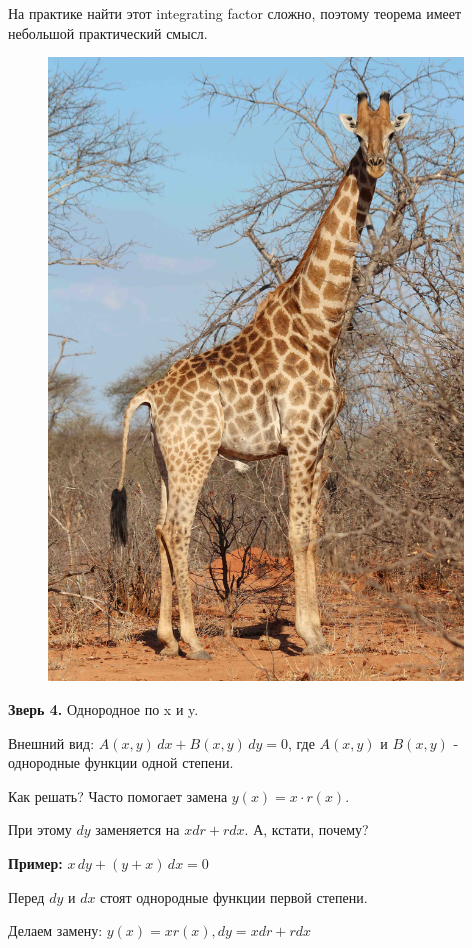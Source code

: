 \documentclass[10pt, a4paper]{article}
\begin{document}
\par На практике найти этот integrating factor сложно, поэтому теорема имеет небольшой практический смысл. \\
\newpage
\pagecolor{JungleGreen}
\begin{figure}[h]
\centering
\includegraphics[width = 11cm]{giraffe.jpg}
\end{figure}
\par \textbf{Зверь 4.} Однородное по x и y.
\par Внешний вид: $A(x, y) \, dx + B(x,y) \, dy = 0$,  где $A(x,y)$ и $B(x,y)$ - однородные функции одной степени.
\par Как решать? Часто помогает замена $y(x) = x \cdot r(x)$.
\par При этому $dy$ заменяется на $xdr + rdx$. А, кстати, почему?
\par \textbf{Пример:} $x \, dy + (y+x) \, dx = 0$
\par Перед $dy$ и $dx$ стоят однородные функции первой степени.
\par Делаем замену: $y(x) = xr(x), dy = xdr + rdx $
\end{document}
